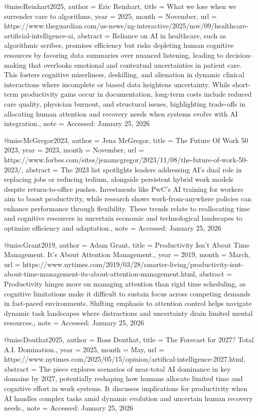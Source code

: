 @misc{Reinhart2025,
  author = {Eric Reinhart},
  title = {What we lose when we surrender care to algorithms},
  year = {2025},
  month = {November},
  url = {https://www.theguardian.com/us-news/ng-interactive/2025/nov/09/healthcare-artificial-intelligence-ai},
  abstract = {Reliance on AI in healthcare, such as algorithmic scribes, promises efficiency but risks depleting human cognitive resources by favoring data summaries over nuanced listening, leading to decision-making that overlooks emotional and contextual uncertainties in patient care. This fosters cognitive miserliness, deskilling, and alienation in dynamic clinical interactions where incomplete or biased data heightens uncertainty. While short-term productivity gains occur in documentation, long-term costs include reduced care quality, physician burnout, and structural issues, highlighting trade-offs in allocating human attention and recovery needs when systems evolve with AI integration.},
  note = {Accessed: January 25, 2026}
}

@misc{McGregor2023,
  author = {Jena McGregor},
  title = {The Future Of Work 50 2023},
  year = {2023},
  month = {November},
  url = {https://www.forbes.com/sites/jenamcgregor/2023/11/08/the-future-of-work-50-2023/},
  abstract = {The 2023 list spotlights leaders addressing AI's dual role in replacing jobs or reducing tedium, alongside persistent hybrid work models despite return-to-office pushes. Investments like PwC's AI training for workers aim to boost productivity, while research shows work-from-anywhere policies can enhance performance through flexibility. These trends relate to reallocating time and cognitive resources in uncertain economic and technological landscapes to optimize efficiency and adaptation.},
  note = {Accessed: January 25, 2026}
}

@misc{Grant2019,
  author = {Adam Grant},
  title = {Productivity Isn't About Time Management. It's About Attention Management.},
  year = {2019},
  month = {March},
  url = {https://www.nytimes.com/2019/03/28/smarter-living/productivity-isnt-about-time-management-its-about-attention-management.html},
  abstract = {Productivity hinges more on managing attention than rigid time scheduling, as cognitive limitations make it difficult to sustain focus across competing demands in fast-paced environments. Shifting emphasis to attention control helps navigate dynamic task landscapes where distractions and uncertainty drain limited mental resources.},
  note = {Accessed: January 25, 2026}
}

@misc{Douthat2025,
  author = {Ross Douthat},
  title = {The Forecast for 2027? Total A.I. Domination.},
  year = {2025},
  month = {May},
  url = {https://www.nytimes.com/2025/05/15/opinion/artifical-intelligence-2027.html},
  abstract = {The piece explores scenarios of near-total AI dominance in key domains by 2027, potentially reshaping how humans allocate limited time and cognitive effort in work systems. It discusses implications for productivity when AI handles complex tasks amid dynamic evolution and uncertain human recovery needs.},
  note = {Accessed: January 25, 2026}
}

